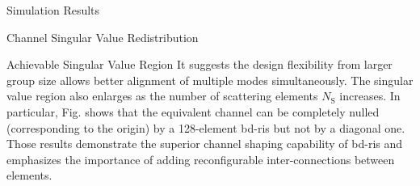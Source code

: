 \documentclass[journal]{IEEEtran}
\begin{document}
\begin{section}{Simulation Results}
\begin{subsection}{Channel Singular Value Redistribution}
\begin{subsubsection}{Achievable Singular Value Region}
			It suggests the design flexibility from larger group size allows better alignment of multiple modes simultaneously.
			The singular value region also enlarges as the number of scattering elements $N_\mathrm{S}$ increases.
			In particular, Fig.  shows that the equivalent channel can be completely nulled (corresponding to the origin) by a 128-element \gls{bd}-\gls{ris} but not by a diagonal one.
			Those results demonstrate the superior channel shaping capability of \gls{bd}-\gls{ris} and emphasizes the importance of adding reconfigurable inter-connections between elements.
		\end{subsubsection}


\end{subsection}
\end{section}
\end{document}
